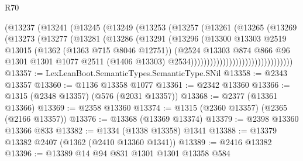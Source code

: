 \begin{lexlean}{R70}
\begin{coremodule}
                                  (@13237
                                    (@13241
                                      (@13245
                                        (@13249
                                          (@13253
                                            (@13257
                                              (@13261
                                                (@13265
                                                  (@13269
                                                    (@13273
                                                      (@13277
                                                        (@13281
                                                          (@13286
                                                            (@13291
                                                              (@13296
                                                                (@13300
                                                                  @13303
                                                                  @2519
                                                                  @13015
                                                                  (@1362 (@1363 @715 @8046 @12751))
                                                                  (@2524
                                                                    @13303
                                                                    @874
                                                                    @866
                                                                    @96
                                                                    @1301
                                                                    @1301
                                                                    @1077
                                                                    @2511
                                                                    (@1406 @13303)
                                                                    @2534))))))))))))))))))))))))))))))))
@13357 := LexLeanBoot.SemanticTypes.SemanticType.SNil
@13358 := @2343 @13357
@13360 := @1136 @13358 @1077
@13361 := @2342 @13360
@13366 := @1315 (@2348 @13357) (@576 (@2031 @13357))
@13368 := @2377 (@13361 @13366)
@13369 := @2358 @13360
@13374 := @1315 (@2360 @13357) (@2365 (@2166 @13357))
@13376 := @13368 (@13369 @13374)
@13379 := @2398 @13360 @13366 @833
@13382 := @1334 (@1338 @13358) @1341
@13388 := @13379 @13382 @2407 (@1362 (@2410 @13360 @1341))
@13389 := @2416 @13382
@13396 := @13389 @14 @94 @831 @1301 @1301 @13358 @584

\end{coremodule}
\end{lexlean}
